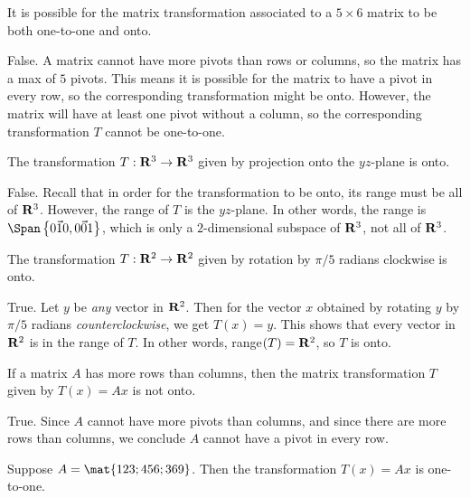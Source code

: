 \begin{problems}
  \problem %
  It is possible for the matrix transformation associated to a $5 \times 6$
  matrix to be both one-to-one and onto.

\begin{solution}
  False.  A matrix cannot have more pivots than rows or columns, so the matrix
  has a max of $5$ pivots.  This means it is possible for the matrix to have a
  pivot in every row, so the corresponding transformation might be onto.
  However, the matrix will have at least one pivot without a column, so the
  corresponding transformation $T$ cannot be one-to-one.
\end{solution}


\problem %
The transformation $T: {\bf R}^3 \to {\bf R}^3$ given by projection onto the
$yz$-plane is onto.

\begin{solution}
False.  Recall that in order for the transformation to be onto, its range must be all of ${\bf R}^3$.  However, the range of $T$ is the $yz$-plane.  In other words, the range is $\Span\left\{\vec{0 1 0}, \vec{0 0 1}\right\}$, which is only a $2$-dimensional subspace of ${\bf R}^3$, not all of ${\bf R}^3$.
\end{solution}


\problem %
The transformation $T: {\bf R}^2 \to {\bf R}^2$ given by rotation by $\pi/5$
radians clockwise is onto.

\begin{solution}
  True.  Let $y$ be \textit{any} vector in ${\bf R}^2$.  Then for the vector $x$
  obtained by rotating $y$ by $\pi/5$ radians \textit{counterclockwise}, we get
  $T(x) = y$.  This shows that every vector in ${\bf R}^2$ is in the range of
  $T$.  In other words, range$(T) = {\bf R}^2$, so $T$ is onto.
\end{solution}

\problem %
If a matrix $A$ has more rows than columns, then the matrix transformation $T$
given by $T(x)=Ax$ is not onto.

\begin{solution}
True.  Since $A$ cannot have more pivots than columns,
    and since there are more rows than columns, we conclude $A$ cannot
    have a pivot in every row.  
\end{solution}

\problem %
Suppose $A = \mat{1 2 3; 4 5 6; 3 6 9}$. Then the transformation $T(x) = Ax$ is one-to-one.


\end{problems}
